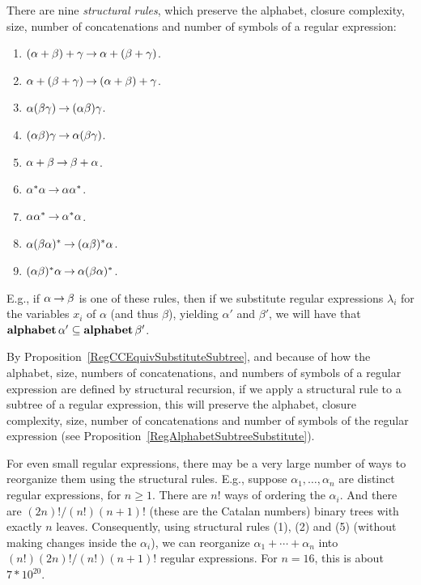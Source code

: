 There are nine \emph{structural rules},
%
%
%
which preserve the alphabet, closure complexity, size, number of
concatenations and number of symbols of a regular expression:
\begin{enumerate}[\quad(1)]
\item $(\alpha + \beta) + \gamma \mathbin{\to} \alpha + (\beta + \gamma)$.

\item $\alpha + (\beta + \gamma) \mathbin{\to} (\alpha + \beta) + \gamma$.

\item $\alpha(\beta\gamma) \mathbin{\to} (\alpha\beta)\gamma$.

\item $(\alpha\beta)\gamma \mathbin{\to} \alpha(\beta\gamma)$.

\item $\alpha + \beta \mathbin{\to} \beta + \alpha$.

\item $\alpha^*\alpha \mathbin{\to} \alpha\alpha^*$.

\item $\alpha\alpha^* \mathbin{\to} \alpha^*\alpha$.

\item $\alpha(\beta\alpha)^* \mathbin{\to} (\alpha\beta)^*\alpha$.

\item $(\alpha\beta)^*\alpha \mathbin{\to} \alpha(\beta\alpha)^*$.
\end{enumerate}
E.g., if $\alpha\mathbin{\to}\beta$ is one of these rules, then if we
substitute regular expressions $\lambda_i$ for the variables $x_i$ of
$\alpha$ (and thus $\beta$), yielding $\alpha'$ and $\beta'$, we will
have that $\mathbf{alphabet}\,\alpha'\subseteq\mathbf{alphabet}\,\beta'$.

By Proposition~\ref{RegCCEquivSubstituteSubtree}, and because of how
the alphabet, size, numbers of concatenations, and numbers of symbols
of a regular expression are defined by structural recursion, if we
apply a structural rule to a subtree of a regular expression, this
will preserve the alphabet, closure complexity, size, number of
concatenations and number of symbols of the regular expression
(see Proposition~\ref{RegAlphabetSubtreeSubstitute}).

For even small regular expressions, there may be a very large number
of ways to reorganize them using the structural rules. E.g., suppose
$\alpha_1,\ldots,\alpha_n$ are distinct regular expressions, for
$n\geq 1$. There are $n!$ ways of ordering the $\alpha_i$.  And there
are $(2n)! / (n!)(n+1)!$ (these are the Catalan numbers) binary trees
with exactly $n$ leaves. Consequently, using structural rules (1), (2)
and (5) (without making changes inside the $\alpha_i$), we can
reorganize $\alpha_1+\cdots+\alpha_n$ into $(n!)(2n)! / (n!)(n+1)!$
regular expressions. For $n=16$, this is about $7*10^{20}$.


